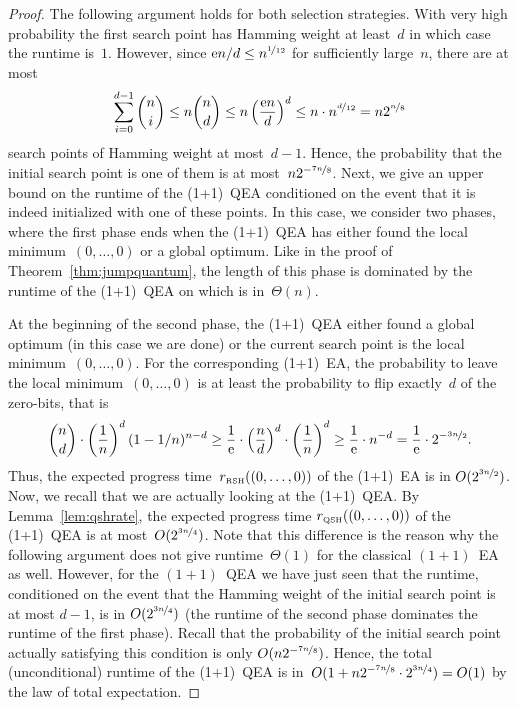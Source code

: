 \documentclass[a4paper,11pt]{article}
\begin{document}
\begin{proof}
The following argument holds for both selection strategies. With very high probability the first search point has Hamming weight at least~$d$ in which case the runtime is~$1$. However, since $\mathrm{e} n/d\le n^{\nicefrac{1}{12}}$ for sufficiently large~$n$, there are at most
\[
\sum_{i=0}^{d-1}\binom{n}{i}\le n\binom{n}{d}\le n\left(\frac{\mathrm{e} n}{d}\right)^d\le n\cdot n^{\nicefrac{d}{12}}=n 2^{\nicefrac{n}{8}}
\]
search points of Hamming weight at most~$d-1$. Hence, the probability that the initial search point is one of them is at most~$n2^{-\nicefrac{7n}{8}}$. Next, we give an upper bound on the runtime of the (1+1)~QEA conditioned on the event that it is indeed initialized with one of these points. In this case, we consider two phases, where the first phase ends when the (1+1)~QEA has either found the local minimum~$(0,\dots,0)$ or a global optimum. Like in the proof of Theorem~\ref{thm:jumpquantum}, the length of this phase is dominated by the runtime of the (1+1)~QEA on \onemax which is in~$\Theta(n)$.

At the beginning of the second phase, the (1+1)~QEA either found a global optimum (in this case we are done) or the current search point is the local minimum~$(0,\dots,0)$. For the corresponding (1+1)~EA, the probability to leave the local minimum~$(0,\dots,0)$ is at least the probability to flip exactly~$d$ of the zero-bits, that is
\[
\binom{n}{d}\cdot\left(\frac{1}{n}\right)^d(1-1/n)^{n-d}\ge\frac{1}{\mathrm{e}}\cdot\left(\frac{n}{d}\right)^d\cdot\left(\frac{1}{n}\right)^d\ge \frac{1}{\mathrm{e}}\cdot n^{-d}=\frac{1}{\mathrm{e}}\cdot2^{-\nicefrac{3n}{2}}.
\]
Thus, the expected progress time~$r_{\text{\tiny\rm RSH}}((0,\dots,0))$ of the (1+1)~EA is in ${O}(2^{\nicefrac{3n}{2}})$. Now, we recall that we are actually looking at the (1+1)~QEA. By Lemma~\ref{lem:qshrate}, the expected progress time $r_{\text{\tiny\rm QSH}}((0,\dots,0))$ of the (1+1)~QEA is at most~${O}(2^{\nicefrac{3n}{4}})$. Note that this difference is the reason why the following argument does not give runtime~$\Theta(1)$ for the classical $(1+1)$~EA as well. However, for the $(1+1)$~QEA we have just seen that the runtime, conditioned on the event that the Hamming weight of the initial search point is at most $d-1$, is in ${O}(2^{\nicefrac{3n}{4}})$ (the runtime of the second phase dominates the runtime of the first phase). Recall that the probability of the initial search point actually satisfying this condition is only ${O}(n 2^{-\nicefrac{7n}{8}})$. Hence, the total (unconditional) runtime of the (1+1)~QEA is in~${O}(1+n 2^{-\nicefrac{7n}{8}}\cdot 2^{\nicefrac{3n}{4}})=O(1)$  by the law of total expectation.
\end{proof}
\end{document}
